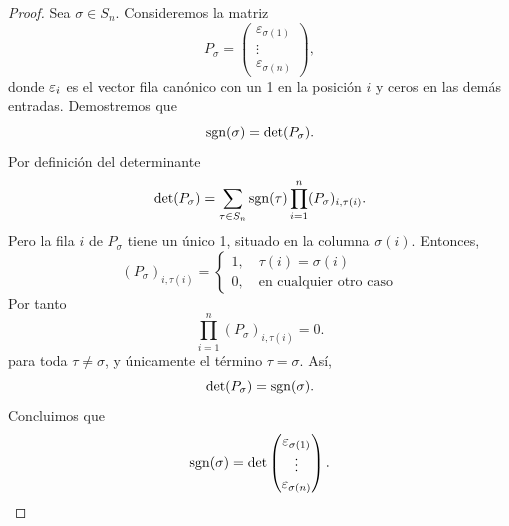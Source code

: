 \documentclass[12pt,a4paper]{article}
\begin{document}
    \begin{proof}
        Sea $\sigma\in S_{n}$. Consideremos la matriz
        \begin{equation*}
            P_{\sigma}=
            \begin{pmatrix}
                \varepsilon_{\sigma(1)}\\
                \vdots\\
                \varepsilon_{\sigma(n)}
            \end{pmatrix},
        \end{equation*}
        donde $\varepsilon_{i}$ es el vector fila canónico con un 1 en la posición $i$ y ceros en las demás
        entradas. Demostremos que
        \begin{equation*}
            \operatorname{sgn}(\sigma)=\det(P_{\sigma}).
        \end{equation*}
        Por definición del determinante
        \begin{equation*}
            \det(P_{\sigma})=\sum_{\tau\in S_{n}}\operatorname{sgn}(\tau)\prod_{i=1}^{n}(P_{\sigma})_{i,\tau(i)}.
        \end{equation*}
        Pero la fila $i$ de $P_{\sigma}$ tiene un único 1, situado en la columna $\sigma(i)$.
        Entonces,
        \begin{equation*}
            (P_{\sigma})_{i,\tau(i)}=
            \begin{cases}
                1,\quad\tau(i)=\sigma(i)\\
                0,\quad\text{en cualquier otro caso}
            \end{cases}
        \end{equation*}
        Por tanto
        \begin{equation*}
            \prod_{i=1}^{n}(P_{\sigma})_{i,\tau(i)}=0.
        \end{equation*}
        para toda $\tau\neq\sigma$, y únicamente el término $\tau=\sigma$. Así,
        \begin{equation*}
            \det(P_{\sigma})=\operatorname{sgn}(\sigma).
        \end{equation*}
        Concluimos que
        \begin{equation*}
            \operatorname{sgn}(\sigma)=\det
            \begin{pmatrix}
                \varepsilon_{\sigma(1)}\\
                \vdots\\
                \varepsilon_{\sigma(n)}
            \end{pmatrix}.
        \end{equation*}

\end{proof}
\end{document}
